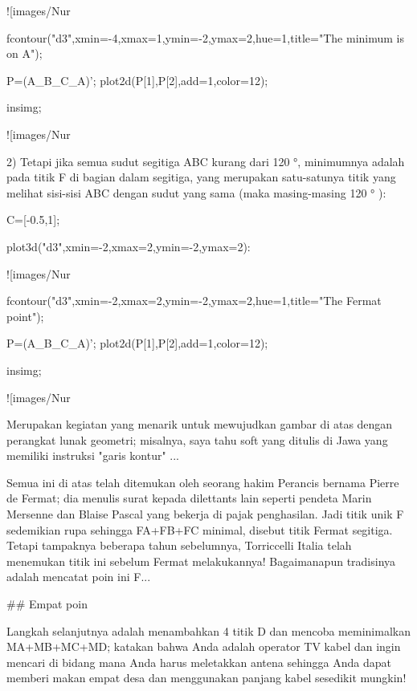 \documentclass{article}
\begin{document}
![images/Nur%

\>fcontour("d3",xmin=-4,xmax=1,ymin=-2,ymax=2,hue=1,title="The minimum is on A");

\>P=(A\_B\_C\_A)'; plot2d(P[1],P[2],add=1,color=12);

\>insimg;


![images/Nur%

2) Tetapi jika semua sudut segitiga ABC kurang dari 120 °, minimumnya
adalah pada titik F di bagian dalam segitiga, yang merupakan
satu-satunya titik yang melihat sisi-sisi ABC dengan sudut yang sama
(maka masing-masing 120 ° ):


\>C=[-0.5,1];

\>plot3d("d3",xmin=-2,xmax=2,ymin=-2,ymax=2):


![images/Nur%

\>fcontour("d3",xmin=-2,xmax=2,ymin=-2,ymax=2,hue=1,title="The Fermat point");

\>P=(A\_B\_C\_A)'; plot2d(P[1],P[2],add=1,color=12);

\>insimg;


![images/Nur%

Merupakan kegiatan yang menarik untuk mewujudkan gambar di atas dengan
perangkat lunak geometri; misalnya, saya tahu soft yang ditulis di
Jawa yang memiliki instruksi "garis kontur" ...


Semua ini di atas telah ditemukan oleh seorang hakim Perancis bernama
Pierre de Fermat; dia menulis surat kepada dilettants lain seperti
pendeta Marin Mersenne dan Blaise Pascal yang bekerja di pajak
penghasilan. Jadi titik unik F sedemikian rupa sehingga FA+FB+FC
minimal, disebut titik Fermat segitiga. Tetapi tampaknya beberapa
tahun sebelumnya, Torriccelli Italia telah menemukan titik ini sebelum
Fermat melakukannya! Bagaimanapun tradisinya adalah mencatat poin ini
F...


## Empat poin

Langkah selanjutnya adalah menambahkan 4 titik D dan mencoba
meminimalkan MA+MB+MC+MD; katakan bahwa Anda adalah operator TV kabel
dan ingin mencari di bidang mana Anda harus meletakkan antena sehingga
Anda dapat memberi makan empat desa dan menggunakan panjang kabel
sesedikit mungkin!
\end{document}
